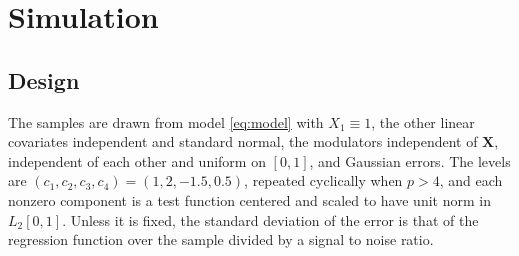 \documentclass[12pt]{article} %
\theoremstyle{definition}
\theoremstyle{plain}
\newcommand{\bX}{\mathbf{X}}
\newcommand{\lvl}[1]{c_{#1}}
\begin{document}
{\color{colR1}
\section{Simulation}
\label{sec:simulation}

\subsection{Design}
\label{sec:sim-design}

The samples are drawn from model \eqref{eq:model} with $X_1 \equiv 1$, the
other linear covariates independent and standard normal, the modulators
independent of $\bX$, independent of each other and uniform on $[0,1]$, and
Gaussian errors. The levels are $(\lvl{1},\lvl{2},\lvl{3},\lvl{4}) =
(1, 2, -1.5, 0.5)$, repeated cyclically when $p > 4$, and each nonzero
component is a test function centered and scaled to have unit norm in
$L_2[0,1]$. Unless it is fixed, the standard deviation of the error is that of
the regression function over the sample divided by a signal to noise ratio.

}
\end{document}
